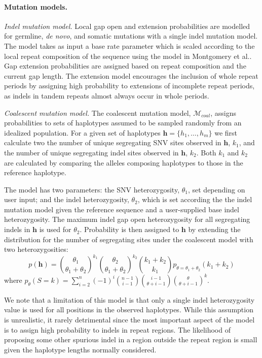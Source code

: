 \documentclass[notitlepage, twocolumn, 10pt]{article}
\begin{document}
\paragraph*{Mutation models.} \emph{Indel mutation model.} Local gap open and extension probabilities are modelled for germline, \textit{de novo}, and somatic mutations with a single indel mutation model. The model takes as input a base rate parameter which is scaled according to the local repeat composition of the sequence using the model in Montgomery et al.\cite{RN577}. Gap extension probabilities are assigned based on repeat composition and the current gap length. The extension model encourages the inclusion of whole repeat periods by assigning high probability to extensions of incomplete
repeat periods, as indels in tandem repeats almost always occur in whole periods.

\vspace{3mm}
\noindent\emph{Coalescent mutation model.} The coalescent mutation model, $\mathcal{M}_{coal}$, assigns probabilities to sets of haplotypes assumed to be sampled randomly from an idealized population. For a given set of haplotypes ${\boldsymbol{h} = \{h_1, \dots, h_m\}}$ we first calculate two the number of unique segregating SNV sites observed in $\boldsymbol{h}$, $k_1$, and the number of unique segregating indel sites observed in $\boldsymbol{h}$,  $k_2$. Both $k_1$ and $k_2$ are calculated by comparing the alleles composing haplotypes to those in the reference haplotype. 

The model has two parameters: the SNV heterozygosity, $\theta_1$, set depending on user input; and the indel heterozygosity, $\theta_2$, which is set according the the indel mutation model given the reference sequence and a user-supplied base indel heterozygosity. The maximum indel gap open heterozygosity for all segregating indels in $\boldsymbol{h}$ is used for $\theta_2$. Probability is then assigned to $\boldsymbol{h}$ by extending the distribution for the number of segregating sites under the coalescent model \cite{RN622} with two heterozygosities:
\begin{equation*}
    p(\boldsymbol{h}) = \binom{\theta_1}{\theta_1 + \theta_2}^{k_1} \binom{\theta_2}{\theta_1 + \theta_2}^{k_2} \binom{k_1 + k_2}{k_1} p_{\theta = \theta_1 + \theta_2} (k_1 + k_2)
\end{equation*}
where $p_\theta(S = k) = \sum_{i=2}^n (-1)^i \binom{n - 1}{i - 1} \binom{i - 1}{\theta + i - 1} \binom{\theta}{\theta + i - 1}^k$.

We note that a limitation of this model is that only a single indel heterozygosity value is used for all positions in the observed haplotypes. While this assumption is unrealistic, it rarely detrimental since the most important aspect of the model is to assign high probability to indels in repeat regions. The likelihood of proposing some other spurious indel in a region outside the repeat region is small given the haplotype lengths normally considered.
\end{document}
